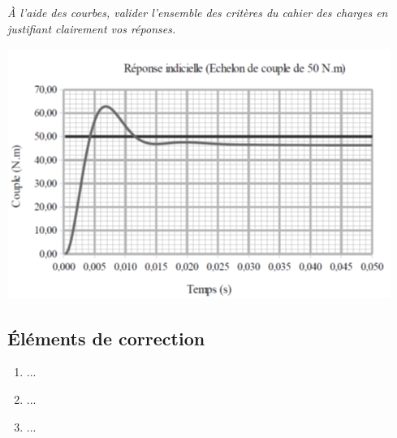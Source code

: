 \documentclass[10pt,fleqn]{article} %
\begin{document}
\begin{multicols}{2}
\subparagraph{}
\textit{À l'aide des courbes, valider l'ensemble des critères du cahier
des charges en justifiant clairement vos réponses. }

\begin{center}
\includegraphics[width=\linewidth]{images/ccmp_10}

\end{center}







\subsection*{Éléments de correction}
\begin{enumerate}
\item ...
\item ...
\item ...
\end{enumerate}
\end{multicols}
\end{document}
